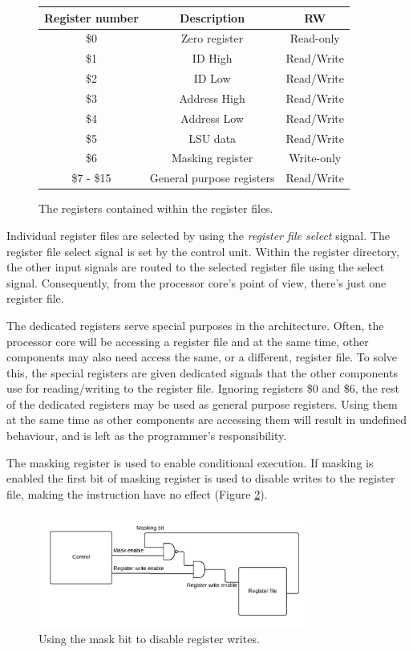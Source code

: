 \documentclass[../main/report.tex]{subfiles}
\begin{document}
\begin{figure}[H]
	\centering
	\begin{tabular}{|c|c|c|}
		\hline Register number & Description & RW \\ 
		\hline \$0 & Zero register & Read-only \\ 
		\hline \$1 & ID High & Read/Write \\ 
		\hline \$2 & ID Low & Read/Write \\ 
		\hline \$3 & Address High & Read/Write \\ 
		\hline \$4 & Address Low & Read/Write \\ 
		\hline \$5 & LSU data & Read/Write \\ 
		\hline \$6 & Masking register & Write-only \\ 
		\hline \$7 - \$15 & General purpose registers & Read/Write \\ 
		\hline 
	\end{tabular} 
	\caption{The registers contained within the register files.}
	\label{tab:registers_overview}
\end{figure}

Individual register files are selected by using the \emph{register file select} signal.
The register file select signal is set by the control unit.
Within the register directory, the other input signals are routed to the selected register file using the select signal.
Consequently, from the processor core's point of view, there's just one register file.

The dedicated registers serve special purposes in the architecture.
Often, the processor core will be accessing a register file and at the same time, other components may also need access the same, or a different, register file.
To solve this, the special registers are given dedicated signals that the other components use for reading/writing to the register file.
Ignoring registers \$0 and \$6, the rest of the dedicated registers may be used as general purpose registers.
Using them at the same time as other components are accessing them will result in undefined behaviour, and is left as the programmer's responsibility.

The masking register is used to enable conditional execution.
If masking is enabled the first bit of masking register is used to disable writes to the register file, making the instruction have no effect (Figure \ref{fig:masking}).
\begin{figure}[H]
	\centering
	\includegraphics[width=0.8\textwidth]{../gpu/diagrams/masking.png}
	\caption{Using the mask bit to disable register writes.}
	\label{fig:masking}
\end{figure}
\end{document}
